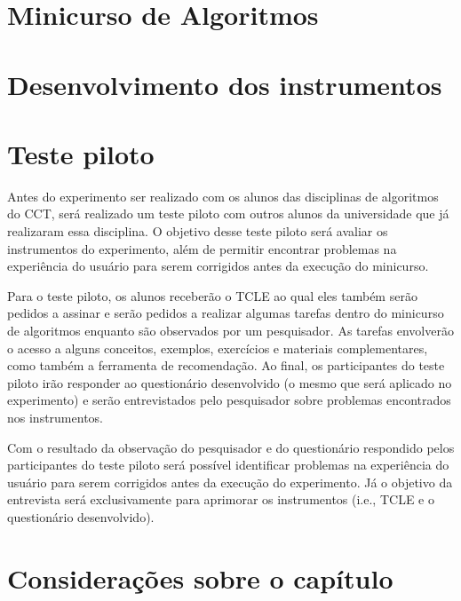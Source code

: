 \section{Minicurso de Algoritmos}

\section{Desenvolvimento dos instrumentos}

\section{Teste piloto}

Antes do experimento ser realizado com os alunos das disciplinas de algoritmos do CCT, será realizado um teste piloto com
outros alunos da universidade que já realizaram essa disciplina. O objetivo desse teste piloto será avaliar os
instrumentos do experimento, além de permitir encontrar problemas na experiência do  usuário para serem corrigidos
antes da execução do minicurso.

Para o teste piloto, os alunos receberão o TCLE ao qual eles também serão pedidos a assinar e serão pedidos a realizar algumas
tarefas dentro do minicurso de algoritmos enquanto são observados por um pesquisador. As tarefas envolverão o acesso a
alguns conceitos, exemplos, exercícios e materiais complementares, como também a ferramenta de recomendação. Ao final, os
participantes do teste piloto irão responder ao questionário desenvolvido (o mesmo que será aplicado no experimento) e
serão entrevistados pelo pesquisador sobre problemas encontrados nos instrumentos.

Com o resultado da observação do pesquisador e do questionário respondido pelos participantes do teste piloto será possível
identificar problemas na experiência do usuário para serem corrigidos antes da execução do experimento. Já o objetivo da
entrevista será exclusivamente para aprimorar os instrumentos (i.e., TCLE e o questionário desenvolvido).

\section{Considerações sobre o capítulo}
